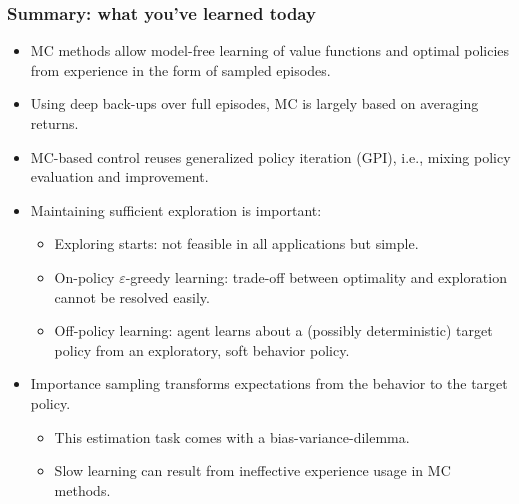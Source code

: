 \begin{frame}
\frametitle{Summary: what you've learned today}
\begin{itemize}
	\item MC methods allow model-free learning of value functions and optimal policies from experience in the form of sampled episodes.
	\item Using deep back-ups over full episodes, MC is largely based on averaging returns. \pause
	\item MC-based control reuses generalized policy iteration (GPI), i.e., mixing policy evaluation and improvement. \pause
	\item Maintaining sufficient exploration is important:
	\begin{itemize}
		\item Exploring starts: not feasible in all applications but simple.
		\item On-policy $\varepsilon$-greedy learning: trade-off between optimality and exploration cannot be resolved easily.
		\item Off-policy learning: agent learns about a (possibly deterministic) target policy from an exploratory, soft behavior policy.
	\end{itemize}\pause
	\item Importance sampling transforms expectations from the behavior to the target policy.
	\begin{itemize}
		\item This estimation task comes with a bias-variance-dilemma.
		\item Slow learning can result from ineffective experience usage in MC methods.
	\end{itemize}
\end{itemize}
\end{frame}
